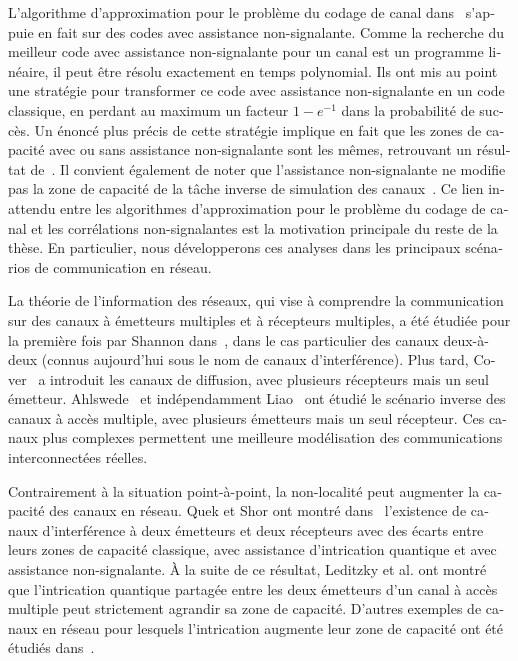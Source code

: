 \begin{otherlanguage}{french}
L'algorithme d'approximation pour le problème du codage de canal dans~\cite{BF18} s'appuie en fait sur des codes avec assistance non-signalante. Comme la recherche du meilleur code avec assistance non-signalante pour un canal est un programme linéaire, il peut être résolu exactement en temps polynomial. Ils ont mis au point une stratégie pour transformer ce code avec assistance non-signalante en un code classique, en perdant au maximum un facteur $1-e^{-1}$ dans la probabilité de succès. Un énoncé plus précis de cette stratégie implique en fait que les zones de capacité avec ou sans assistance non-signalante sont les mêmes, retrouvant un résultat de~\cite{Matthews12}. Il convient également de noter que l'assistance non-signalante ne modifie pas la zone de capacité de la tâche inverse de simulation des canaux~\cite{CRBT22}. Ce lien inattendu entre les algorithmes d'approximation pour le problème du codage de canal et les corrélations non-signalantes est la motivation principale du reste de la thèse. En particulier, nous développerons ces analyses dans les principaux scénarios de communication en réseau.

La théorie de l'information des réseaux, qui vise à comprendre la communication sur des canaux à émetteurs multiples et à récepteurs multiples, a été étudiée pour la première fois par Shannon dans~\cite{Shannon61}, dans le cas particulier des canaux deux-à-deux (connus aujourd'hui sous le nom de canaux d'interférence). Plus tard, Cover~\cite{Cover72} a introduit les canaux de diffusion, avec plusieurs récepteurs mais un seul émetteur. Ahlswede~\cite{Ahlswede73} et indépendamment Liao~\cite{Liao73} ont étudié le scénario inverse des canaux à accès multiple, avec plusieurs émetteurs mais un seul récepteur. Ces canaux plus complexes permettent une meilleure modélisation des communications interconnectées réelles.

Contrairement à la situation point-à-point, la non-localité peut augmenter la capacité des canaux en réseau. Quek et Shor ont montré dans~\cite{QS17} l'existence de canaux d'interférence à deux émetteurs et deux récepteurs avec des écarts entre leurs zones de capacité classique, avec assistance d'intrication quantique et avec assistance non-signalante. À la suite de ce résultat, Leditzky et al. ont montré que l'intrication quantique partagée entre les deux émetteurs d'un canal à accès multiple peut strictement agrandir sa zone de capacité. D'autres exemples de canaux en réseau pour lesquels l'intrication augmente leur zone de capacité ont été étudiés dans~\cite{Noetzel20,ND20}.


\end{otherlanguage}
